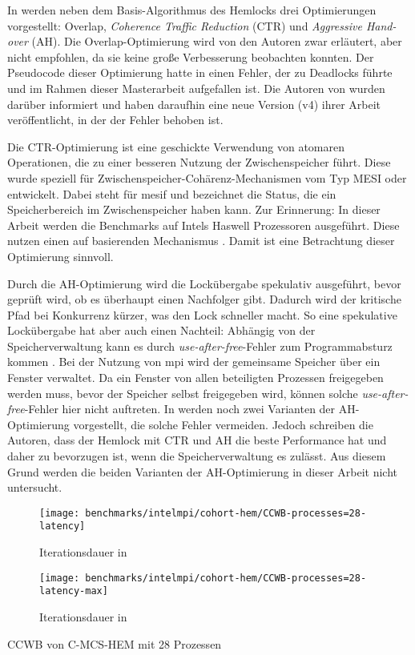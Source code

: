 In \cite{Hemlock} werden neben dem Basis-Algorithmus des Hemlocks drei Optimierungen vorgestellt:
Overlap, \textit{Coherence Traffic Reduction} (CTR) und \textit{Aggressive Hand-over} (AH).
Die Overlap-Optimierung wird von den Autoren zwar erläutert,
aber nicht empfohlen,
da sie keine große Verbesserung beobachten konnten.
Der Pseudocode dieser Optimierung hatte in \cite{Hemlock} einen Fehler,
der zu Deadlocks führte
und im Rahmen dieser Masterarbeit aufgefallen ist.
Die Autoren von \cite{Hemlock} wurden darüber informiert
und haben daraufhin eine neue Version (v4) ihrer Arbeit veröffentlicht,
in der der Fehler behoben ist.

Die CTR-Optimierung ist eine geschickte Verwendung von atomaren Operationen,
die zu einer besseren Nutzung der \gls{Zwischenspeicher} führt.
Diese wurde speziell für \gls{Zwischenspeicher}-Cohärenz-Mechanismen vom Typ MESI oder  entwickelt.
Dabei steht  für \glsdesc{mesif} und bezeichnet die Status,
die ein Speicherbereich im \gls{Zwischenspeicher} haben kann.
Zur Erinnerung:
In dieser Arbeit werden die Benchmarks auf Intels Haswell Prozessoren ausgeführt.
Diese nutzen einen auf  basierenden Mechanismus \cite{Haswell-cache-coherence}.
Damit ist eine Betrachtung dieser Optimierung sinnvoll.

Durch die AH-Optimierung wird die Lockübergabe spekulativ ausgeführt,
bevor geprüft wird,
ob es überhaupt einen Nachfolger gibt.
Dadurch wird der kritische Pfad bei Konkurrenz kürzer,
was den Lock schneller macht.
So eine spekulative Lockübergabe hat aber auch einen Nachteil:
Abhängig von der Speicherverwaltung kann es
durch \textit{use-after-free}-Fehler
zum Programmabsturz kommen \cite{Hemlock}.
Bei der Nutzung von \gls{mpi} wird der gemeinsame Speicher über ein \gls{Fenster} verwaltet.
Da ein \gls{Fenster} von allen beteiligten Prozessen freigegeben werden muss,
bevor der Speicher selbst freigegeben wird,
können solche \textit{use-after-free}-Fehler hier nicht auftreten.
In \cite{Hemlock} werden noch zwei Varianten der AH-Optimierung vorgestellt,
die solche Fehler vermeiden.
Jedoch schreiben die Autoren,
dass der Hemlock mit CTR und AH die beste Performance hat
und daher zu bevorzugen ist,
wenn die Speicherverwaltung es zulässt.
Aus diesem Grund werden die beiden Varianten der AH-Optimierung in dieser Arbeit nicht untersucht.

\begin{benchmark}[h]
    \begin{subfigure}{.5\textwidth}
        \texttt{[image: benchmarks/intelmpi/cohort-hem/CCWB-processes=28-latency]}
        \caption{Iterationsdauer in }
        \label{ben:cohort_hem_ccwb_28_latency}
    \end{subfigure}
    \begin{subfigure}{.5\textwidth}
        \texttt{[image: benchmarks/intelmpi/cohort-hem/CCWB-processes=28-latency-max]}
        \caption{Iterationsdauer in }
        \label{ben:cohort_hem_ccwb_28_latency_max}
    \end{subfigure}
    \caption{CCWB von C-MCS-HEM mit 28 Prozessen}
    \label{ben:cohort_hem_ccwb_28}
\end{benchmark}

